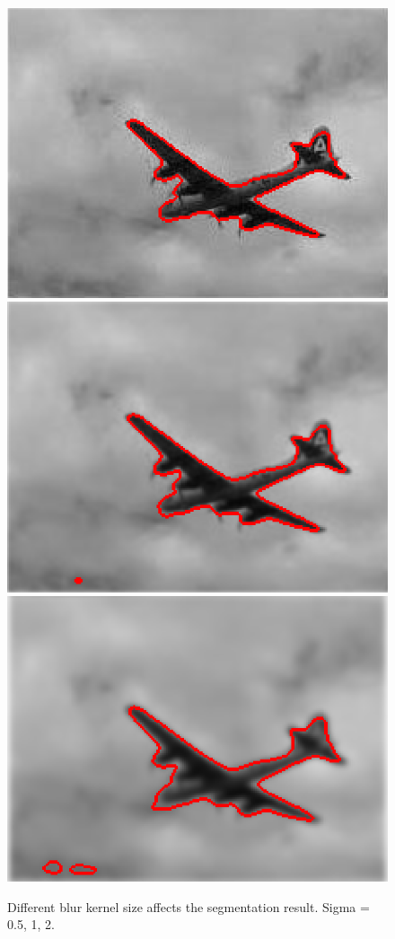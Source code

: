\documentclass{article}
\begin{document}
\begin{figure}[H]
\caption{Different blur kernel size affects the segmentation result. Sigma = 0.5, 1, 2.}
\begin{center}
\includegraphics[scale=.27]{cv_blur05.png}
\includegraphics[scale=.27]{cv_blur1.png}
\includegraphics[scale=.27]{cv_blur2.png}
\end{center}
\end{figure}
\end{document}
